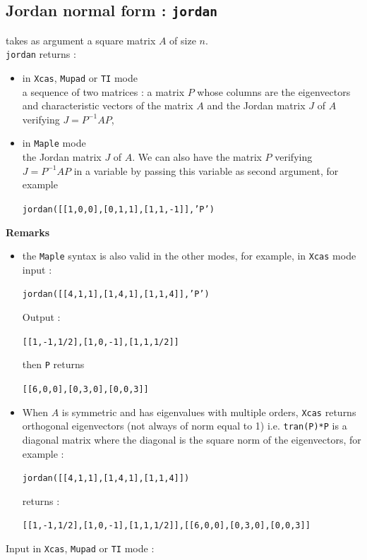 \documentclass[a4paper,11pt]{book}
\begin{document}
\subsection{Jordan normal form : {\tt jordan}}
 takes as argument a square
matrix $A$ of size $n$.\\
{\tt jordan} returns :
\begin{itemize}
\item in {\tt Xcas}, {\tt Mupad} or {\tt TI} mode\\ 
a sequence of two matrices : a matrix $P$ whose columns are
the eigenvectors and characteristic vectors
of the matrix $A$ and the Jordan matrix $J$ of $A$ verifying $J=P^{-1}AP$,
\item in {\tt Maple} mode\\
the Jordan matrix $J$ of $A$. We can also have the matrix $P$ verifying
$J=P^{-1}AP$ in a variable 
by passing this variable as second argument, for example 
\begin{center} {\tt jordan([[1,0,0],[0,1,1],[1,1,-1]],'P')}
\end{center}
\end{itemize}
{\bf Remarks}
\begin{itemize}
\item the {\tt Maple} syntax is also valid in the other modes, for example, in
{\tt Xcas} mode input :
\begin{center} {\tt jordan([[4,1,1],[1,4,1],[1,1,4]],'P')}
\end{center}
Output :
\begin{center} {\tt [[1,-1,1/2],[1,0,-1],[1,1,1/2]]}
\end{center}
then {\tt P} returns
\begin{center} {\tt [[6,0,0],[0,3,0],[0,0,3]]}
\end{center}
\item When $A$ is symmetric and has eigenvalues with multiple orders,
{\tt Xcas} returns orthogonal eigenvectors (not always of norm equal to 1)
i.e. {\tt tran(P)*P} is a diagonal matrix where the diagonal is the square norm
of the eigenvectors, for example :
\begin{center} {\tt jordan([[4,1,1],[1,4,1],[1,1,4]])}
\end{center}
returns :
\begin{center} {\tt [[1,-1,1/2],[1,0,-1],[1,1,1/2]],[[6,0,0],[0,3,0],[0,0,3]]}
\end{center}
\end{itemize} 
 Input in {\tt Xcas}, {\tt Mupad} or {\tt TI} mode :
\end{document}
